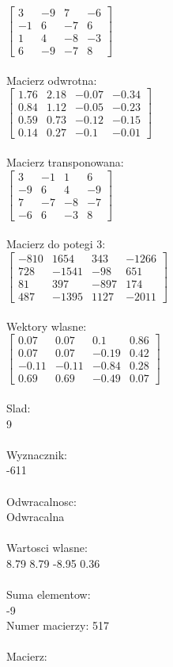 \documentclass[a4paper,12pt]{article}
\begin{document}
$\begin{bmatrix} 3&-9&7&-6\\-1&6&-7&6\\1&4&-8&-3\\6&-9&-7&8 \end{bmatrix}$
\\
\\
Macierz odwrotna:\\

$\begin{bmatrix} 1.76&2.18&-0.07&-0.34\\0.84&1.12&-0.05&-0.23\\0.59&0.73&-0.12&-0.15\\0.14&0.27&-0.1&-0.01 \end{bmatrix}$
\\
\\
Macierz transponowana:\\

$\begin{bmatrix} 3&-1&1&6\\-9&6&4&-9\\7&-7&-8&-7\\-6&6&-3&8 \end{bmatrix}$
\\
\\
Macierz do potegi 3:\\

$\begin{bmatrix} -810&1654&343&-1266\\728&-1541&-98&651\\81&397&-897&174\\487&-1395&1127&-2011 \end{bmatrix}$
\\
\\
Wektory wlasne:\\

$\begin{bmatrix} 0.07&0.07&0.1&0.86\\0.07&0.07&-0.19&0.42\\-0.11&-0.11&-0.84&0.28\\0.69&0.69&-0.49&0.07 \end{bmatrix}$
\\
\\
Slad:\\
9
\\
\\
Wyznacznik:\\
-611
\\
\\
Odwracalnosc:\\
Odwracalna
\\
\\
Wartosci wlasne:\\
8.79 8.79 -8.95 0.36
\\
\\
Suma elementow:\\
-9
\\
\newpage
Numer macierzy:
517
\\
\\
Macierz:\\
\end{document}
